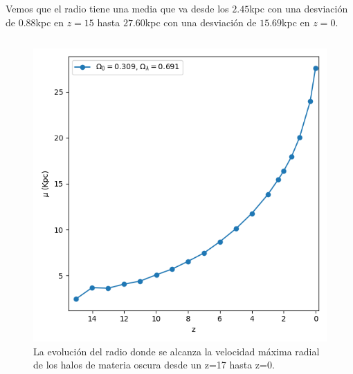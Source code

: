 \documentclass{beamer}
\begin{document}
	\begin{frame}
		\small Vemos que el radio tiene una media que va desde los $2.45$kpc con una desviación de $0.88$kpc en $z=15$ hasta $27.60$kpc con una desviación de $15.69$kpc en $z=0$.
		
		\begin{columns}[t]
			\begin{column}{.5\textwidth}
				\begin{figure}
					\centering
					\includegraphics[scale=0.3]{RunCanonica/VMaxRad_Mean_RunCanonica.png}
					\caption{\footnotesize La evolución del radio donde se alcanza la velocidad máxima radial de los halos de materia oscura desde un z=17 hasta z=0.}
					\label{fig:Canon-VMAxRadMean}
				\end{figure}
			\end{column}


\end{columns}
\end{frame}
\end{document}
